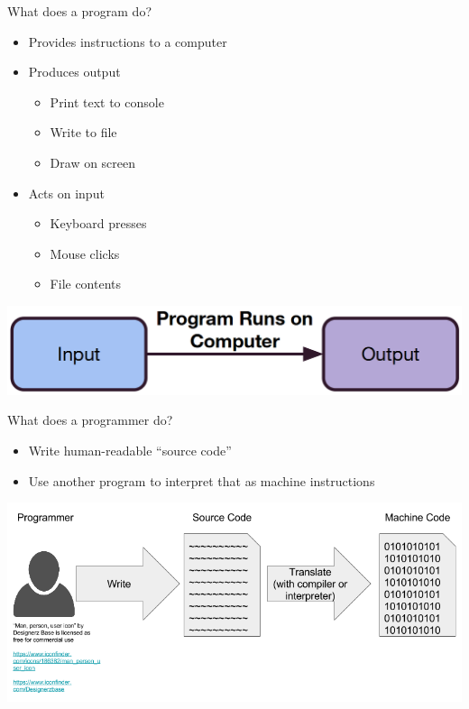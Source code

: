 \begin{frame}{What does a program do?}
\begin{itemize}
\item Provides instructions to a computer
\item Produces output
  \begin{itemize}
    \item Print text to console
    \item Write to file
    \item Draw on screen
  \end{itemize}
\item Acts on input
  \begin{itemize}
    \item Keyboard presses
    \item Mouse clicks
    \item File contents
  \end{itemize}
\end{itemize}
\begin{center}
\includegraphics[scale=.2]{program-input-output.png}
\end{center}
\end{frame}

\begin{frame}{What does a programmer do?}
\begin{itemize}
  \item Write human-readable ``source code''
  \item Use another program to interpret that as machine instructions
\end{itemize}
\begin{center}
\includegraphics[scale=.34]{human-source-machine.png}
\end{center}
\end{frame}

